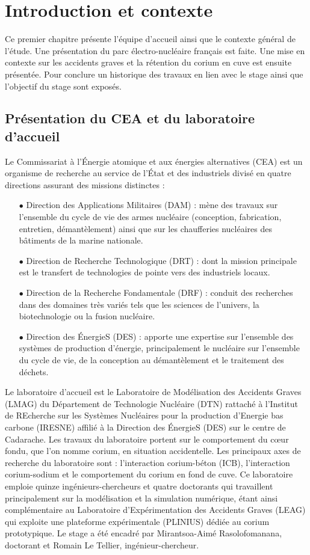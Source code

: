 \chapter{Introduction et contexte}
Ce premier chapitre présente l’équipe d’accueil ainsi que le contexte général de l’étude. Une présentation du parc électro-nucléaire français est faite. Une mise en contexte sur les accidents graves et la rétention du corium en cuve est ensuite présentée. Pour conclure un historique des travaux en lien avec le stage ainsi que l’objectif du stage sont exposés.
\section{Présentation du CEA et du laboratoire d'accueil}
Le Commissariat à l'Énergie atomique et aux énergies alternatives (CEA) est un organisme de recherche au service de l'État et des industriels divisé en quatre directions assurant des missions distinctes :
\begin{itemize}
	\item[$\bullet$] Direction des Applications Militaires (DAM) : mène des travaux sur l'ensemble du cycle de vie des armes nucléaire (conception, fabrication, entretien, démantèlement) ainsi que sur les chaufferies nucléaires des bâtiments de la marine nationale.
	\item[$\bullet$] Direction de Recherche Technologique (DRT) : dont la mission principale est le transfert de technologies de pointe vers des industriels locaux.
	\item[$\bullet$] Direction de la Recherche Fondamentale (DRF) : conduit des recherches dans des domaines très variés tels que les sciences de l'univers, la biotechnologie ou la fusion nucléaire.
	\item[$\bullet$] Direction des ÉnergieS (DES) : apporte une expertise sur l'ensemble des systèmes de production d'énergie, principalement le nucléaire sur l'ensemble du cycle de vie, de la conception au démantèlement et le traitement des déchets. 
\end{itemize}
Le laboratoire d'accueil est le Laboratoire de Modélisation des Accidents Graves (LMAG) du Département de Technologie Nucléaire (DTN) rattaché à l'Institut de REcherche sur les Systèmes Nucléaires pour la production d’Energie bas carbone (IRESNE) affilié à la Direction des ÉnergieS (DES) sur le centre de Cadarache.
Les travaux du laboratoire portent sur le comportement du c\oe ur fondu, que l'on nomme corium, en situation accidentelle. Les principaux axes de recherche du laboratoire sont : l'interaction corium-béton (ICB), l'interaction corium-sodium et le comportement du corium en fond de cuve. Ce laboratoire emploie quinze ingénieurs-chercheurs et quatre doctorants qui travaillent principalement sur la modélisation et la simulation numérique, étant ainsi complémentaire au Laboratoire d'Expérimentation des Accidents Graves (LEAG) qui exploite une plateforme expérimentale (PLINIUS) dédiée au corium prototypique. Le stage a été encadré par Mirantsoa-Aimé Rasolofomanana, doctorant et Romain Le Tellier, ingénieur-chercheur.

